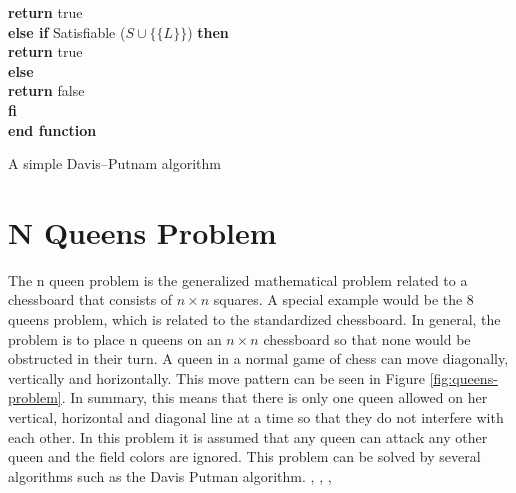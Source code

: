 \begin{listing}[ht]
      \hspace*{1.0cm}
      \textbf{return} true\\
    \hspace*{0.5cm}
    \textbf{else if} Satisfiable ($S \cup \{\{L\}\}$) \textbf{then}\\
      \hspace*{1.0cm}
      \textbf{return} true\\
    \hspace*{0.5cm}
    \textbf{else}\\
      \hspace*{1.0cm}
      \textbf{return} false\\
    \hspace*{0.5cm}
    \textbf{fi}\\
  \textbf{end function}
  \caption{A simple Davis–Putnam algorithm \cite{Zhang2000}}
  \label{listing:1}
\end{listing}  


\section{N Queens Problem}
The n queen problem is the generalized mathematical problem related to a chessboard that consists of $n \times n$ squares. A special example would be the 8 queens problem, which is related to the standardized chessboard. In general, the problem is to place n queens on an $n \times n$ chessboard so that none would be obstructed in their turn. A queen in a normal game of chess can move diagonally, vertically and horizontally. This move pattern can be seen in Figure \ref{fig:queens-problem}. In summary, this means that there is only one queen allowed on her vertical, horizontal and diagonal line at a time so that they do not interfere with each other. In this problem it is assumed that any queen can attack any other queen and the field colors are ignored. This problem can be solved by several algorithms such as the Davis Putman algorithm. \cite{Bell2009}, \cite{Watkins2012}, \cite[146\psq]{Nudelman1995}, \cite{Stroetman2019}

